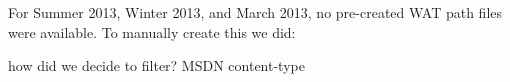 \documentclass[conference]{IEEEtran}
\begin{document}

For Summer 2013, Winter 2013, and March 2013, no pre-created WAT path files were available. To manually create this we did:




how did we decide to filter? MSDN content-type

\end{document}
